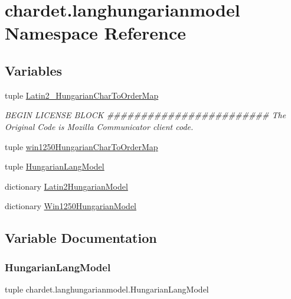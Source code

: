 \hypertarget{namespacechardet_1_1langhungarianmodel}{}\section{chardet.\+langhungarianmodel Namespace Reference}
\label{namespacechardet_1_1langhungarianmodel}
\subsection*{Variables}
\begin{DoxyCompactItemize}
\item 
tuple \hyperlink{namespacechardet_1_1langhungarianmodel_a991e006c409e723d9fa539e596ddbe73}{Latin2\+\_\+\+Hungarian\+Char\+To\+Order\+Map}
\begin{DoxyCompactList}\small\item\em B\+E\+G\+IN L\+I\+C\+E\+N\+SE B\+L\+O\+CK \#\#\#\#\#\#\#\#\#\#\#\#\#\#\#\#\#\#\#\#\#\#\#\# The Original Code is Mozilla Communicator client code. \end{DoxyCompactList}\item 
tuple \hyperlink{namespacechardet_1_1langhungarianmodel_a8f84a038bf7814667746dccc80666d4e}{win1250\+Hungarian\+Char\+To\+Order\+Map}
\item 
tuple \hyperlink{namespacechardet_1_1langhungarianmodel_a247b1504de7a92f62d337140fcdc19d9}{Hungarian\+Lang\+Model}
\item 
dictionary \hyperlink{namespacechardet_1_1langhungarianmodel_ade62a37e04f7d870c176ea1c17f409b3}{Latin2\+Hungarian\+Model}
\item 
dictionary \hyperlink{namespacechardet_1_1langhungarianmodel_aba944c61ae0426b048c1543596e3a4e3}{Win1250\+Hungarian\+Model}
\end{DoxyCompactItemize}


\subsection{Variable Documentation}
\mbox{\label{namespacechardet_1_1langhungarianmodel_a247b1504de7a92f62d337140fcdc19d9}} 
\subsubsection{\texorpdfstring{Hungarian\+Lang\+Model}{HungarianLangModel}}
{\footnotesize\ttfamily tuple chardet.\+langhungarianmodel.\+Hungarian\+Lang\+Model}

